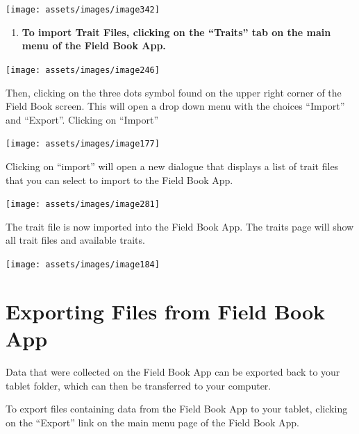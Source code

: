 \documentclass[
  12pt,
]{book}
\providecommand{\tightlist}{%
  \setlength{\itemsep}{0pt}\setlength{\parskip}{0pt}}
\begin{document}
\begin{center}\texttt{[image: assets/images/image342]} \end{center}

\begin{enumerate}
\def\labelenumi{\arabic{enumi}.}
\setcounter{enumi}{2}
\tightlist
\item
  \textbf{To import Trait Files, clicking on the ``Traits'' tab on the main menu of the Field Book App.}
\end{enumerate}

\begin{center}\texttt{[image: assets/images/image246]} \end{center}

Then, clicking on the three dots symbol found on the upper right corner of the Field Book screen. This will open a drop down menu with the choices ``Import'' and ``Export''. Clicking on ``Import''

\begin{center}\texttt{[image: assets/images/image177]} \end{center}

Clicking on ``import'' will open a new dialogue that displays a list of trait files that you can select to import to the Field Book App.

\begin{center}\texttt{[image: assets/images/image281]} \end{center}

The trait file is now imported into the Field Book App. The traits page will show all trait files and available traits.

\begin{center}\texttt{[image: assets/images/image184]} \end{center}

\hypertarget{exporting-files-from-field-book-app}{%
\section{Exporting Files from Field Book App}\label{exporting-files-from-field-book-app}}

Data that were collected on the Field Book App can be exported back to your tablet folder, which can then be transferred to your computer.

To export files containing data from the Field Book App to your tablet, clicking on the ``Export'' link on the main menu page of the Field Book App.
\end{document}
